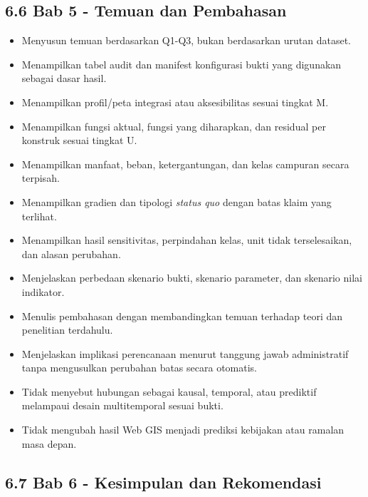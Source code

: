\documentclass[
  indonesian,
  11pt,
]{article}
\providecommand{\tightlist}{%
  \setlength{\itemsep}{0pt}\setlength{\parskip}{0pt}}
\renewcommand{\tightlist}{%
  \setlength{\itemsep}{0.22em}%
  \setlength{\parskip}{0pt}%
}
\begin{document}
\subsection{6.6 Bab 5 - Temuan dan
Pembahasan}\label{bab-5---temuan-dan-pembahasan}

\begin{itemize}
\tightlist
\item[$\square$]
  Menyusun temuan berdasarkan Q1-Q3, bukan berdasarkan urutan dataset.
\item[$\square$]
  Menampilkan tabel audit dan manifest konfigurasi bukti yang digunakan
  sebagai dasar hasil.
\item[$\square$]
  Menampilkan profil/peta integrasi atau aksesibilitas sesuai tingkat M.
\item[$\square$]
  Menampilkan fungsi aktual, fungsi yang diharapkan, dan residual per
  konstruk sesuai tingkat U.
\item[$\square$]
  Menampilkan manfaat, beban, ketergantungan, dan kelas campuran secara
  terpisah.
\item[$\square$]
  Menampilkan gradien dan tipologi \emph{status quo} dengan batas klaim
  yang terlihat.
\item[$\square$]
  Menampilkan hasil sensitivitas, perpindahan kelas, unit tidak
  terselesaikan, dan alasan perubahan.
\item[$\square$]
  Menjelaskan perbedaan skenario bukti, skenario parameter, dan skenario
  nilai indikator.
\item[$\square$]
  Menulis pembahasan dengan membandingkan temuan terhadap teori dan
  penelitian terdahulu.
\item[$\square$]
  Menjelaskan implikasi perencanaan menurut tanggung jawab administratif
  tanpa mengusulkan perubahan batas secara otomatis.
\item[$\square$]
  Tidak menyebut hubungan sebagai kausal, temporal, atau prediktif
  melampaui desain multitemporal sesuai bukti.
\item[$\square$]
  Tidak mengubah hasil Web GIS menjadi prediksi kebijakan atau ramalan
  masa depan.
\end{itemize}

\subsection{6.7 Bab 6 - Kesimpulan dan
Rekomendasi}\label{bab-6---kesimpulan-dan-rekomendasi}
\end{document}
